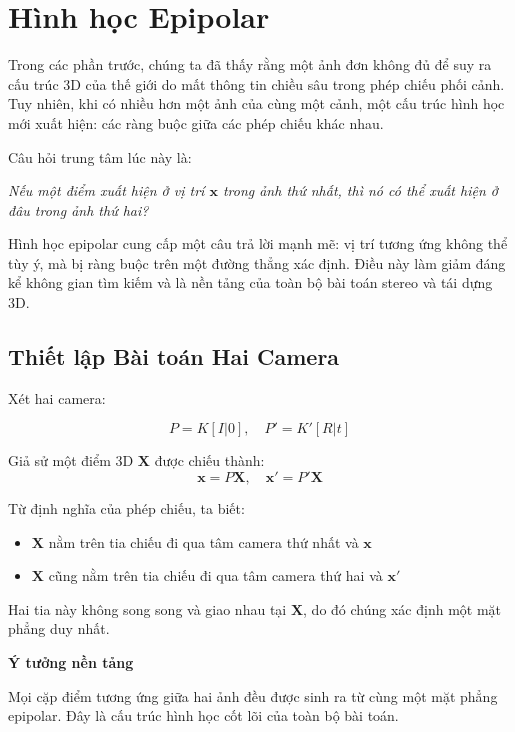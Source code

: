 \section{Hình học Epipolar}
\label{sec:epipolar_geometry}

Trong các phần trước, chúng ta đã thấy rằng một ảnh đơn không đủ để suy ra cấu trúc 3D của thế giới do mất thông tin chiều sâu trong phép chiếu phối cảnh. Tuy nhiên, khi có nhiều hơn một ảnh của cùng một cảnh, một cấu trúc hình học mới xuất hiện: các ràng buộc giữa các phép chiếu khác nhau.

Câu hỏi trung tâm lúc này là:

\begin{center}
	\textit{Nếu một điểm xuất hiện ở vị trí $\mathbf{x}$ trong ảnh thứ nhất, thì nó có thể xuất hiện ở đâu trong ảnh thứ hai?}
\end{center}

Hình học epipolar cung cấp một câu trả lời mạnh mẽ: vị trí tương ứng không thể tùy ý, mà bị ràng buộc trên một đường thẳng xác định. Điều này làm giảm đáng kể không gian tìm kiếm và là nền tảng của toàn bộ bài toán stereo và tái dựng 3D.

\subsection{Thiết lập Bài toán Hai Camera}
\label{subsec:two_view_setup}

Xét hai camera:

\[
P = K[I|0], \quad P' = K'[R|t]
\]

Giả sử một điểm 3D $\mathbf{X}$ được chiếu thành:
\[
\mathbf{x} = P\mathbf{X}, \quad \mathbf{x}' = P'\mathbf{X}
\]

Từ định nghĩa của phép chiếu, ta biết:
\begin{itemize}
	\item $\mathbf{X}$ nằm trên tia chiếu đi qua tâm camera thứ nhất và $\mathbf{x}$
	\item $\mathbf{X}$ cũng nằm trên tia chiếu đi qua tâm camera thứ hai và $\mathbf{x}'$
\end{itemize}

Hai tia này không song song và giao nhau tại $\mathbf{X}$, do đó chúng xác định một mặt phẳng duy nhất.

\begin{mdframed}[style=infobox]
	\textbf{Ý tưởng nền tảng}
	
	Mọi cặp điểm tương ứng giữa hai ảnh đều được sinh ra từ cùng một mặt phẳng epipolar. Đây là cấu trúc hình học cốt lõi của toàn bộ bài toán.
\end{mdframed}

